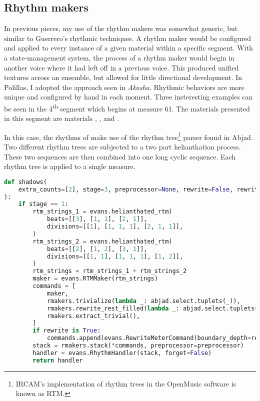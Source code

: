 \subsection{Rhythm makers}

In previous pieces, my use of the rhythm makers was somewhat generic, but similar to Guerrero's rhythmic techniques. A rhythm maker would be configured and applied to every instance of a given material within a specific segment. With a state-management system, the process of a rhythm maker would begin in another voice where it had left off in a previous voice. This produced unified textures across an ensemble, but allowed for little directional development. In Polillas, I adopted the approach seen in \textit{Akasha}. Rhythmic behaviors are more unique and configured by hand in each moment. Three insteresting examples can be seen in the 4\textsuperscript{th} segment which begins at measure 61. The materials presented in this segment are materials , , and .

In this case, the rhythms of  make use of the rhythm tree\footnote{IRCAM's implementation of rhythm trees in the OpenMusic software is known as RTM.} parser found in Abjad. Two different rhythm trees are subjected to a two part helianthation process. These two sequences are then combined into one long cyclic sequence. Each rhythm tree is applied to a single measure.

\begin{lstlisting}[language=Python,frame=tb,caption={Stage 1 of material A rhythms in Polillas},label=lst:p-a-rhythm]
def shadows(
    extra_counts=[2], stage=3, preprocessor=None, rewrite=False, rewrite_boundary=None
): 
    if stage == 1:
        rtm_strings_1 = evans.helianthated_rtm(
            beats=[[3], [1, 1], [2, 1]],
            divisions=[[1], [1, 1, 1], [2, 1, 1]],
        )
        rtm_strings_2 = evans.helianthated_rtm(
            beats=[[2], [1, 2], [3, 1]],
            divisions=[[1, 1], [1, 1, 1], [1, 2]],
        )
        rtm_strings = rtm_strings_1 + rtm_strings_2
        maker = evans.RTMMaker(rtm_strings)
        commands = [
            maker,
            rmakers.trivialize(lambda _: abjad.select.tuplets(_)),
            rmakers.rewrite_rest_filled(lambda _: abjad.select.tuplets(_)),
            rmakers.extract_trivial(),
        ]
        if rewrite is True:
            commands.append(evans.RewriteMeterCommand(boundary_depth=rewrite_boundary))
        stack = rmakers.stack(*commands, preprocessor=preprocessor)
        handler = evans.RhythmHandler(stack, forget=False)
        return handler
\end{lstlisting}

